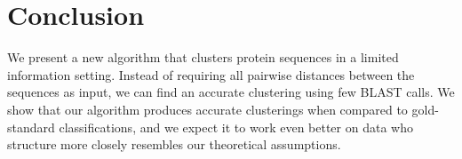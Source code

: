 \documentclass{llncs} \usepackage{algorithm}
\begin{document}
\section{Conclusion}

We present a new algorithm that clusters protein sequences in a limited information setting.  Instead of requiring all pairwise distances between the sequences as input, we can find an accurate clustering using few BLAST calls.  We show that our algorithm produces accurate clusterings when compared to gold-standard classifications, and we expect it to work even better on data who structure more closely resembles our theoretical assumptions.




\end{document}
